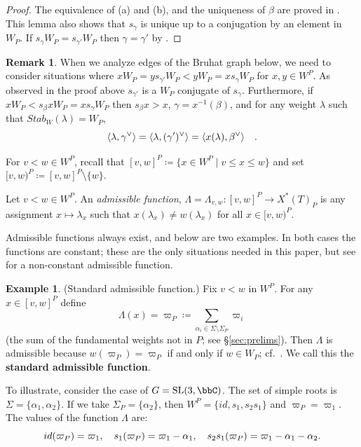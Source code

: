 \documentclass[11pt]{article}
\theoremstyle{definition}
\newtheorem{remark}[theo]{Remark}
\newtheorem{example}[theo]{Example}
\numberwithin{equation}{section}
\DeclareMathOperator{\SL}{SL}
\begin{document}
\begin{proof} The equivalence of (a) and (b), and the uniqueness of $\beta$ are proved in 
	\cite[Lemma 4.1]{fulton.woodward}. This lemma also shows that $s_\gamma$ 
	is unique up to a conjugation by an element in $W_P$. If 
	$s_\gamma W_P = s_{\gamma'}W_P$ then $\gamma = \gamma'$ by 
	\cite[Lemma 2.2]{buch.m:nbhds}.\end{proof}
\begin{remark}\label{rem:gammabeta} When we analyze edges of the Bruhat graph below, 
	we need to consider situations where
	$x W_P = y s_{\gamma'} W_P < y W_P= x s_\gamma W_P$ for $x,y \in W^P$. As observed in the proof 
	above $s_{\gamma'}$ is a $W_P$ conjugate of $s_\gamma$. Furthermore, if
	$xW_P < s_\beta x W_P = x s_\gamma W_P$ then $s_\beta x > x$, $\gamma = x^{-1}(\beta)$,
	and for any weight $\lambda$ such that $Stab_W(\lambda) = W_P$,
	\[ \langle \lambda , \gamma^\vee \rangle = \langle \lambda, (\gamma')^\vee \rangle = \langle x(\lambda), \beta^\vee \rangle 
	\quad \/. \]
\end{remark}
For $v<w\in W^P$, recall that $[v, w]^P\coloneqq \{x\in W^P\mid v\leq x\leq w\}$ and set $[v,w)^P\coloneqq [v, w]^P\setminus \{ w \}$.
\begin{defin} Let $v<w\in W^P$. An \textit{admissible function},
	$\Lambda=\Lambda_{v,w}:[v, w]^P \to X^{*}(T)_P$ is any assignment $x \mapsto \lambda_x$ 
	such that $x(\lambda_x)\neq w(\lambda_x)$ for all $x\in [v, w)^P$.
\end{defin} 
Admissible functions always exist, and below are two examples. In both cases the functions are constant;
	these are the only situations needed in this paper, but see  for a non-constant admissible function.
	\begin{example}\label{examp:admissible}
		(Standard admissible function.) Fix $v < w$ in $W^P$. For any $x \in [v,w]^P$ define 
		\[ \Lambda(x)=\varpi_P\coloneqq  \displaystyle\sum_{\alpha_i\in \Sigma \setminus \Sigma_P}\varpi_i \]  
		(the sum of the fundamental weights not in $P$; see \S\ref{sec:prelims}).
	Then $\Lambda$ is admissible because $w(\varpi_P) = \varpi_P$ if and only if $w \in W_P$; cf.~\cite[Ch.5, \S 4.6]{bourbaki:Lie4-6}. We call this the {\bf standard admissible function}. 
	
	To illustrate, consider the case of $G=\SL(3,\bbC)$. The set of simple roots is $\Sigma=\{\alpha_1,\alpha_2\}$. If we 
	take $\Sigma_P=\{\alpha_2\}$, then $W^P=\{id, s_1, s_2s_1\}$ and $\varpi_P=\varpi_1$. The values of the function 
	$\Lambda$ are:
	\[ id(\varpi_P)=\varpi_1 \/, \quad s_1(\varpi_P)=\varpi_1-\alpha_1\/, \quad s_2s_1(\varpi_P)=\varpi_1 - \alpha_1 - \alpha_2 \/.\]
\end{example}
\end{document}
